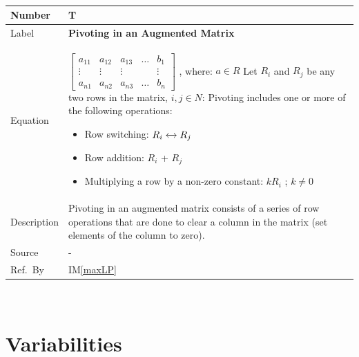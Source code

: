 \documentclass[12pt]{article}
\newcommand{\colAwidth}{0.13\textwidth}
\newcommand{\colBwidth}{0.82\textwidth}
\newcounter{theorynum} %
\newcommand{\iref}[1]{IM\ref{#1}}
\begin{document}
~\newline

\noindent
\begin{minipage}{\textwidth}
	\renewcommand*{\arraystretch}{1.5}
	\begin{tabular}{| p{\colAwidth} | p{\colBwidth}|}
		\hline
		\rowcolor[gray]{0.9}
		Number& T{theorynum}\thetheorynum \label{T_pivoting}\\
		\hline
		Label&\bf Pivoting in an Augmented Matrix\\
		\hline
		Equation&$\begin{bmatrix}
		a_{11} & a_{12} & a_{13} & \dots & b_{1}\\
		\vdots & \vdots & \vdots & &\vdots\\
		a_{n1} & a_{n2} & a_{n3} & \dots & b_{n}	
		\end{bmatrix}$ , where: $a \in R$ \newline \newline
		Let $R_i$ and $R_j$ be any two rows in the matrix, $i, j \in N$: 
		\newline
		Pivoting includes one or more of the following operations:
		\begin{itemize}
			\item Row switching: $R_i \xleftrightarrow{} R_j$
			
			\item Row addition: $R_i$ + $R_j$
			
			\item Multiplying a row by a non-zero constant: $kR_i$ ; 
			$k \neq 0$
		\end{itemize} \\
		\hline
		Description & 
		Pivoting in an augmented matrix consists of a series of row operations 
		that are done to clear a column in the matrix (set elements of the 
		column to zero).\\
		\hline
		Source & -\\
		\hline
		Ref.\ By & \iref{maxLP}\\
		\hline
	\end{tabular}
\end{minipage}\\


\section{Variabilities} \label{Sec_Variabilities} 
\end{document}
